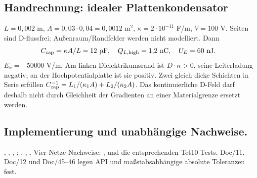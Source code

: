 \subsection{Handrechnung: idealer Plattenkondensator}
$L=0{,}002$ m, $A=0{,}03\cdot0{,}04=0{,}0012$ m$^2$,
$\kappa=2\cdot10^{-11}$ F/m, $V=100$ V. Seiten sind D-flussfrei;
Außenraum/Randfelder werden nicht modelliert. Dann
\begin{equation}\label{eq:capacitor-example}
C_{\rm cap}=\kappa A/L=12\ {\rm pF},\quad
Q_{L,\rm high}=1{,}2\ {\rm nC},\quad U_E=60\ {\rm nJ}.
\end{equation}
$E_x=-50000$ V/m. Am linken Dielektrikumsrand ist $D\cdot n>0$,
seine Leiterladung negativ; an der Hochpotentialplatte ist sie positiv.
Zwei gleich dicke Schichten in Serie erfüllen
$C_{\rm cap}^{-1}=L_1/(\kappa_1A)+L_2/(\kappa_2A)$.
Das kontinuierliche D-Feld darf deshalb nicht durch Gleichheit der
Gradienten an einer Materialgrenze ersetzt werden.

\subsection*{Implementierung und unabhängige Nachweise.}
{\small\raggedright
{},
,
,
;
,
,
.
Vier-Netze-Nachweise: ,
 und die
entsprechenden Tet10-Tests. Doc/11, Doc/12 und Doc/45--46 legen API und
maßstabsabhängige absolute Toleranzen fest.

\par}
